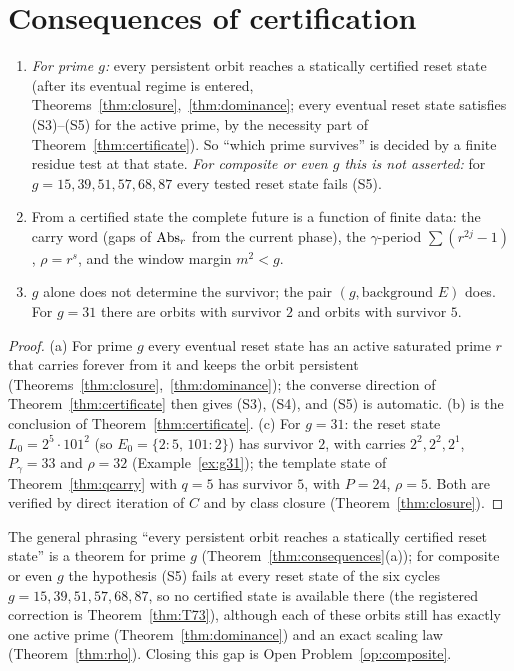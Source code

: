 \section{Consequences of certification}

\begin{theorem}\label{thm:consequences}
\begin{enumerate}[label=(\alph*),nosep]
\item \emph{For prime \(g\):} every persistent orbit reaches a statically certified reset state (after its eventual regime is entered, Theorems~\ref{thm:closure},~\ref{thm:dominance}; every eventual reset state satisfies (S3)--(S5) for the active prime, by the necessity part of Theorem~\ref{thm:certificate}). So ``which prime survives'' is decided by a finite residue test at that state. \emph{For composite or even \(g\) this is not asserted:} for \(g=15,39,51,57,68,87\) every tested reset state fails (S5).
\item From a certified state the complete future is a function of finite data: the carry word (gaps of \(\operatorname{Abs}_r\) from the current phase), the \(\gamma\)-period \(\sum(r^{2j}-1)\), \(\rho=r^s\), and the window margin \(m^2<g\).
\item \(g\) alone does not determine the survivor; the pair \((g,\text{background }E)\) does. For \(g=31\) there are orbits with survivor \(2\) and orbits with survivor \(5\).
\end{enumerate}
\end{theorem}
\begin{proof}
(a) For prime \(g\) every eventual reset state has an active saturated prime \(r\) that carries forever from it and keeps the orbit persistent (Theorems~\ref{thm:closure},~\ref{thm:dominance}); the converse direction of Theorem~\ref{thm:certificate} then gives (S3), (S4), and (S5) is automatic. (b) is the conclusion of Theorem~\ref{thm:certificate}. (c) For \(g=31\): the reset state \(L_0=2^5\cdot101^2\) (so \(E_0=\{2{:}5,\,101{:}2\}\)) has survivor \(2\), with carries \(2^2,2^2,2^1\), \(P_\gamma=33\) and \(\rho=32\) (Example~\ref{ex:g31}); the template state of Theorem~\ref{thm:qcarry} with \(q=5\) has survivor \(5\), with \(P=24\), \(\rho=5\). Both are verified by direct iteration of \(C\) and by class closure (Theorem~\ref{thm:closure}).
\end{proof}

\begin{remark}\label{rem:T73a}
The general phrasing ``every persistent orbit reaches a statically certified reset state'' is a theorem for prime \(g\) (Theorem~\ref{thm:consequences}(a)); for composite or even \(g\) the hypothesis (S5) fails at every reset state of the six cycles \(g=15,39,51,57,68,87\), so no certified state is available there (the registered correction is Theorem~\ref{thm:T73}), although each of these orbits still has exactly one active prime (Theorem~\ref{thm:dominance}) and an exact scaling law (Theorem~\ref{thm:rho}). Closing this gap is Open Problem~\ref{op:composite}.
\end{remark}
